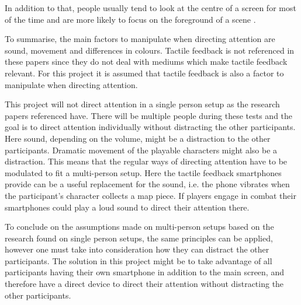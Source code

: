 In addition to that, people usually tend to look at the centre of a screen for most of the time and are more likely to focus on the foreground of a scene \cite{osberger1998automatic}.


To summarise, the main factors to manipulate when directing attention are sound, movement and differences in colours. Tactile feedback is not referenced in these papers since they do not deal with mediums which make tactile feedback relevant. For this project it is assumed that tactile feedback is also a factor to manipulate when directing attention. 

This project will not direct attention in a single person setup as the research papers referenced have. There will be multiple people during these tests and the goal is to direct attention individually without distracting the other participants. Here sound, depending on the volume, might be a distraction to the other participants. Dramatic movement of the playable characters might also be a distraction. This means that the regular ways of directing attention have to be modulated to fit a multi-person setup. Here the tactile feedback smartphones provide can be a useful replacement for the sound, i.e. the phone vibrates when the participant's character collects a map piece. If players engage in combat their smartphones could play a loud sound to direct their attention there. 

To conclude on the assumptions made on multi-person setups based on the research found on single person setups, the same principles can be applied, however one must take into consideration how they can distract the other participants. The solution in this project might be to take advantage of all participants having their own smartphone in addition to the main screen, and therefore have a direct device to direct their attention without distracting the other participants.
